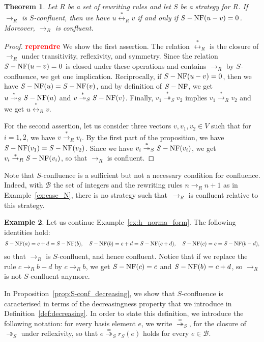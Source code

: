 \documentclass[10pt]{easychair}
\newtheorem{theorem}{Theorem}[section]
\theoremstyle{definition}
\newtheorem{example}[theorem]{Example}
\newcommand\todo[1]{{\bf\textcolor{red}{#1}}}
\newcommand\basis{\mathscr{B}}
\newcommand\rewR{\to_R}
\newcommand\rewS{\twoheadrightarrow_S}
\newcommand\transR{\overset{*}{\to}_R}
\newcommand\transS{\overset{*}{\twoheadrightarrow}_S}
\newcommand\equivR{\overset{*}{\leftrightarrow}_R}
\DeclareMathOperator{\SNF}{{\it S}-NF}
\begin{document}
\begin{theorem}\label{thm:S-confluence_criterion}
  Let $R$ be a set of rewriting rules and let $S$ be a strategy for $R$.
  If $\rewR$ is $S$-confluent, then we have $u\equivR v$ if and only if
  $\SNF(u-v)=0$. Moreover, $\rewR$ is confluent.
\end{theorem}

\begin{proof}
  \todo{reprendre}
  We show the first assertion. The relation $\equivR$ is the closure of
  $\rewR$ under transitivity, reflexivity, and symmetry. Since the
  relation $\SNF(u-v)=0$ is closed under these operations and contains
  $\rewR$ by $S$-confluence, we get one implication. Reciprocally, if
  $\SNF(u-v)=0$, then we have $\SNF(u)=\SNF(v)$, and by definition of
  $\SNF$, we get $u\transS\SNF(u)$ and $v\transS\SNF(v)$. Finally,
  $v_1\transS v_2$ implies $v_1\transR v_2$ and we get $u\equivR v$.

  For the second assertion, let us consider three vectors
  $v,v_1,v_2\in V$ such that for $i=1,2$, we have $v\transR v_i$. By the
  first part of the proposition, we have $\SNF(v_1)=\SNF(v_2)$. Since we
  have $v_i\transS\SNF(v_i)$, we get $v_i\transR\SNF(v_i)$, so that
  $\rewR$ is confluent.
\end{proof}
\smallskip

Note that $S$-confluence is a sufficient but not a necessary condition for
confluence. Indeed, with $\basis$ the set of integers and the rewriting rules
$n\rewR n+1$ as in Example~\ref{ex:case_N}, there is no strategy such
that~$\rewR$ is confluent relative to this strategy.  \smallskip

\begin{example}\label{ex:S-conf}
  Let us continue Example~\ref{ex:h_norma_form}. The following identities
  hold:
  \[\SNF(a)=c+d=\SNF(b),\quad\SNF(b)=c+d=\SNF(c+d),\quad\SNF(c)=c=
  \SNF(b-d),
  \smallskip\]
  so that $\rewR$ is $S$-confluent, and hence confluent. Notice that if
  we replace the rule $c\rewR b-d$ by $c\rewR b$, we get $\SNF(c)=c$ and
  $\SNF(b)=c+d$, so $\rewR$ is not $S$-confluent anymore. 
\end{example}
\smallskip

In Proposition~\ref{prop:S-conf_decreasing}, we show that $S$-confluence
is caracterised in terms of the decreasingness property that we introduce
in Definition~\ref{def:decreasing}. In order to state this definition, we
introduce the following notation: for every basis element $e$, we write
$\overset{=}{\twoheadrightarrow}_S$, for the closure of $\rewS$ under
reflexivity, so that $e\overset{=}{\twoheadrightarrow}_Sr_S(e)$ holds for
every $e\in\basis$.
\smallskip
\end{document}
